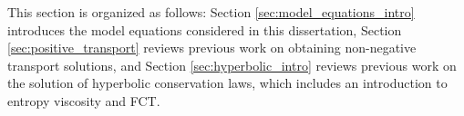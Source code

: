 This section is organized as follows: Section \ref{sec:model_equations_intro}
introduces the model equations considered in this dissertation,
Section \ref{sec:positive_transport} reviews previous work on
obtaining non-negative transport solutions, and
Section \ref{sec:hyperbolic_intro} reviews previous work on the
solution of hyperbolic conservation laws, which includes an
introduction to entropy viscosity and FCT.
